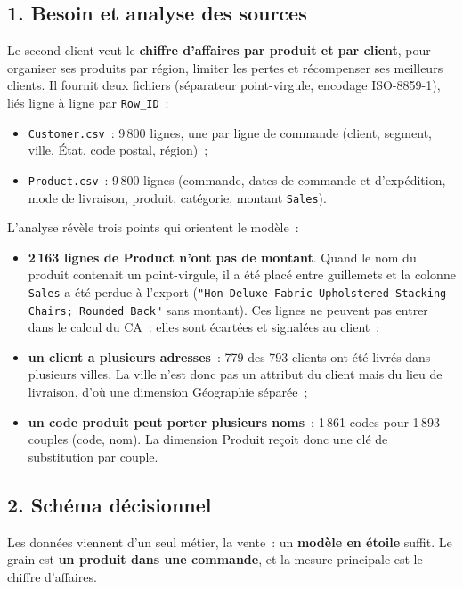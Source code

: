 \subsection*{1. Besoin et analyse des sources}
{}

\noindent Le second client veut le \textbf{chiffre d'affaires par produit et par client}, pour organiser ses produits par région, limiter les pertes et récompenser ses meilleurs clients. Il fournit deux fichiers (séparateur point-virgule, encodage ISO-8859-1), liés ligne à ligne par \texttt{Row\_ID}~:
\begin{itemize}
	\item \texttt{Customer.csv}~: 9\,800 lignes, une par ligne de commande (client, segment, ville, État, code postal, région)~;
	\item \texttt{Product.csv}~: 9\,800 lignes (commande, dates de commande et d'expédition, mode de livraison, produit, catégorie, montant \texttt{Sales}).
\end{itemize}

\noindent L'analyse révèle trois points qui orientent le modèle~:
\begin{itemize}
	\item \textbf{2\,163 lignes de Product n'ont pas de montant}. Quand le nom du produit contenait un point-virgule, il a été placé entre guillemets et la colonne \texttt{Sales} a été perdue à l'export (\texttt{"Hon Deluxe Fabric Upholstered Stacking Chairs; Rounded Back"} sans montant). Ces lignes ne peuvent pas entrer dans le calcul du CA~: elles sont écartées et signalées au client~;
	\item \textbf{un client a plusieurs adresses}~: 779 des 793 clients ont été livrés dans plusieurs villes. La ville n'est donc pas un attribut du client mais du lieu de livraison, d'où une dimension Géographie séparée~;
	\item \textbf{un code produit peut porter plusieurs noms}~: 1\,861 codes pour 1\,893 couples (code, nom). La dimension Produit reçoit donc une clé de substitution par couple.
\end{itemize}

\subsection*{2. Schéma décisionnel}
{}

\noindent Les données viennent d'un seul métier, la vente~: un \textbf{modèle en étoile} suffit. Le grain est \textbf{un produit dans une commande}, et la mesure principale est le chiffre d'affaires.

